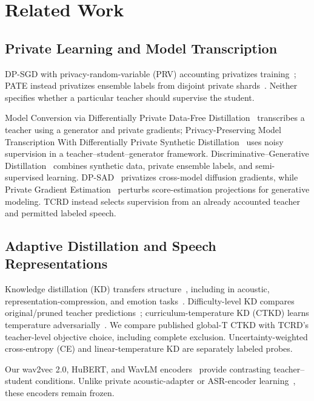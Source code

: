 \documentclass[journal]{IEEEtran}
\theoremstyle{definition}
\theoremstyle{plain}
\begin{document}
\section{Related Work}
\label{sec:related_work}
\subsection{Private Learning and Model Transcription}
DP-SGD with privacy-random-variable (PRV) accounting privatizes training~\cite{abadi2016deepLearningDP,mironov2017rdp,yousefpour2021opacus}; PATE instead privatizes ensemble labels from disjoint private shards~\cite{papernot2017pate,papernot2018pate}. Neither specifies whether a particular teacher should supervise the student.

Model Conversion via Differentially Private Data-Free Distillation~\cite{liu2023datafree} transcribes a teacher using a generator and private gradients; Privacy-Preserving Model Transcription With Differentially Private Synthetic Distillation~\cite{liu2026syntheticdistill} uses noisy supervision in a teacher--student--generator framework. Discriminative--Generative Distillation~\cite{ge2023discriminativegenerative} combines synthetic data, private ensemble labels, and semi-supervised learning. DP-SAD~\cite{liu2024stochasticadversarial} privatizes cross-model diffusion gradients, while Private Gradient Estimation~\cite{liu2024privategradient} perturbs score-estimation projections for generative modeling. TCRD instead selects supervision from an already accounted teacher and permitted labeled speech.


\subsection{Adaptive Distillation and Speech Representations}
Knowledge distillation (KD) transfers structure~\cite{hinton2015distilling}, including in acoustic, representation-compression, and emotion tasks~\cite{chebotar2016distilling,chang2022distilhubert,srinivasan2022representation,shome2024speech}. Difficulty-level KD compares original/pruned teacher predictions~\cite{ham2024difficultykd}; curriculum-temperature KD (CTKD) learns temperature adversarially~\cite{li2023ctkd}. We compare published global-T CTKD with TCRD's teacher-level objective choice, including complete exclusion. Uncertainty-weighted cross-entropy (CE) and linear-temperature KD are separately labeled probes.


Our wav2vec 2.0, HuBERT, and WavLM encoders~\cite{baevski2020wav2vec2,hsu2021hubert,chen2022wavlm} provide contrasting teacher--student conditions. Unlike private acoustic-adapter or ASR-encoder learning~\cite{ho2023differentially,chauhan2024training}, these encoders remain frozen.
\end{document}
